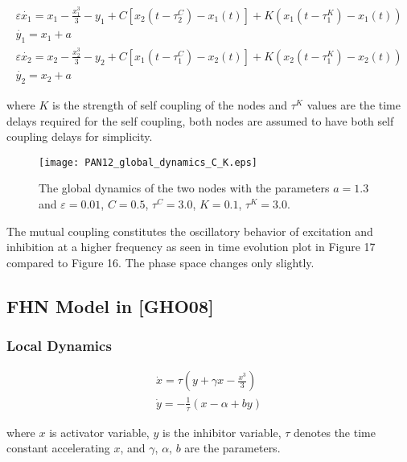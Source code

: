 \documentclass[12pt]{article}
\begin{document}
\begin{subequations} \begin{align} \varepsilon  \dot{x_1} = x_1 - \frac{x_1^3}{3} -y_1  + C [x_2(t-\tau_2^C)-x_1(t)] + K(x_1(t-\tau_1^K) - x_1(t)) \label{eqn: frobenius 14}\\  \dot{y_1} = x_1+a \label{eqn: frobenius 15}  \\ \varepsilon  \dot{x_2} = x_2 - \frac{x_2^3}{3} -y_2  + C [x_1(t-\tau_1^C)-x_2(t)] + K(x_2(t-\tau_1^K) - x_2(t)) \label{eqn: frobenius 16}  \\  \dot{y_2} = x_2+a \label{eqn: frobenius 17} 
\end{align} 
\end{subequations}

where $K$ is the strength of self coupling of the nodes and $\tau^K$ values are the time delays required for the self coupling, both nodes are assumed to have both self coupling delays for simplicity.

\begin{figure}[h!]
	\centering
	\texttt{[image: PAN12\_global\_dynamics\_C\_K.eps]}
		\caption{The global dynamics of the two nodes with the parameters $a=1.3$ and $\varepsilon = 0.01$, $C=0.5$, $\tau^C= 3.0$, $K=0.1$, $\tau^K= 3.0$.}
\end{figure}

The mutual coupling constitutes the oscillatory behavior of excitation and inhibition at a higher frequency as seen in time evolution plot in Figure 17 compared to Figure 16. The phase space changes only slightly.

\subsection{FHN Model in [GHO08]}

\subsubsection{Local Dynamics}

\begin{subequations}
 \begin{align}\dot{x} = \tau (y + \gamma x - \frac{x^3}{3})  \label{eqn: frobenius 17}\\  \dot{y} = -\frac{1}{\tau} (x - \alpha + b y) \label{eqn: frobenius 18}   \end{align} 
\end{subequations}

where $x$ is activator variable, $y$ is the inhibitor variable, $\tau$ denotes the time constant accelerating $x$, and $\gamma$, $\alpha$, $b$ are the parameters. 
\end{document}
